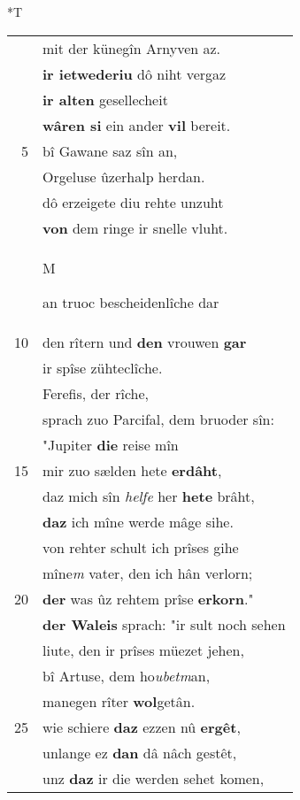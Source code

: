 \documentclass[8pt,a4paper,notitlepage]{article}
\begin{document}
\begin{table}[ht]
\hspace{0.5cm}
\begin{minipage}[t]{0.5\linewidth}
\small
\begin{center}*T
\end{center}
\begin{tabular}{rl}
 & mit der künegîn Arnyven az.\\ 
 & \textbf{ir ietwederiu} dô niht vergaz\\ 
 & \textbf{ir alten} gesellecheit\\ 
 & \textbf{wâren si} ein ander \textbf{vil} bereit.\\ 
5 & bî Gawane saz sîn an,\\ 
 & Orgeluse ûzerhalp herdan.\\ 
 & dô erzeigete diu rehte unzuht\\ 
 & \textbf{von} dem ringe ir snelle vluht.\\ 
 & \begin{large}M\end{large}an truoc bescheidenlîche dar\\ 
10 & den rîtern und \textbf{den} vrouwen \textbf{gar}\\ 
 & ir spîse zühteclîche.\\ 
 & Ferefis, der rîche,\\ 
 & sprach zuo Parcifal, dem bruoder sîn:\\ 
 & "Jupiter \textbf{die} reise mîn\\ 
15 & mir zuo sælden hete \textbf{erdâht},\\ 
 & daz mich sîn \textit{helfe} her \textbf{hete} brâht,\\ 
 & \textbf{daz} ich mîne werde mâge sihe.\\ 
 & von rehter schult ich prîses gihe\\ 
 & mîne\textit{m} vater, den ich hân verlorn;\\ 
20 & \textbf{der} was ûz rehtem prîse \textbf{erkorn}."\\ 
 & \textbf{der Waleis} sprach: "ir sult noch sehen\\ 
 & liute, den ir prîses müezet jehen,\\ 
 & bî Artuse, dem ho\textit{ubetm}an,\\ 
 & manegen rîter \textbf{wol}getân.\\ 
25 & wie schiere \textbf{daz} ezzen nû \textbf{ergêt},\\ 
 & unlange ez \textbf{dan} dâ nâch gestêt,\\ 
 & unz \textbf{daz} ir die werden sehet komen,\\ 

\end{tabular}
\end{minipage}
\end{table}
\end{document}
